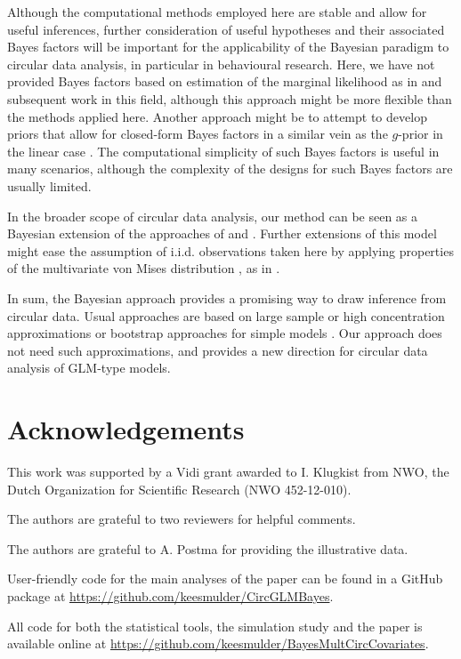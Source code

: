 Although the computational methods employed here are stable and allow for useful inferences, further consideration of useful hypotheses and their associated Bayes factors will be important for the applicability of the Bayesian paradigm to circular data analysis, in particular in behavioural research. Here, we have not provided Bayes factors based on estimation of the marginal likelihood as in \citet{chib1995marginal} and subsequent work in this field, although this approach might be more flexible than the methods applied here. Another approach might be to attempt to develop priors that allow for closed-form Bayes factors in a similar vein as the \(g\)-prior in the linear case \citep{zellner1986bayesian, liang2012mixtures}. The computational simplicity of such Bayes factors is useful in many scenarios, although the complexity of the designs for such Bayes factors are usually limited.

In the broader scope of circular data analysis, our method can be seen as a Bayesian extension of the approaches of \citet{artes2008hypothesis} and \citet{lagona2016regression}. Further extensions of this model might ease the assumption of i.i.d. observations taken here by applying properties of the multivariate von Mises distribution \citep{mardia2008multivariate, mardia2014some}, as in \citet{lagona2016regression}.

In sum, the Bayesian approach provides a promising way to draw inference from circular data. Usual approaches are based on large sample or high concentration approximations \citep{artes2008hypothesis} or bootstrap approaches for simple models \citep{baayen2012test, baayen2014evaluating}. Our approach does not need such approximations, and provides a new direction for circular data analysis of GLM-type models.

\section{Acknowledgements}

This work was supported by a Vidi grant awarded to I. Klugkist from NWO, the Dutch Organization for Scientific Research (NWO 452-12-010).

The authors are grateful to two reviewers for helpful comments.

The authors are grateful to A. Postma for providing the illustrative data.

User-friendly code for the main analyses of the paper can be found in a GitHub package at \url{https://github.com/keesmulder/CircGLMBayes}.

All code for both the statistical tools, the simulation study and the paper is available online at \url{https://github.com/keesmulder/BayesMultCircCovariates}.





\newpage

\appendix
